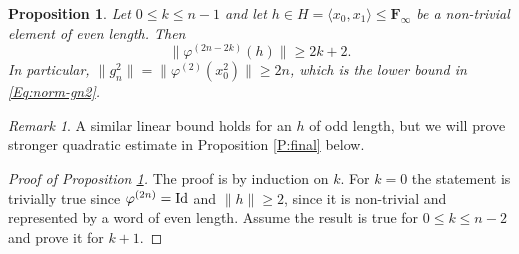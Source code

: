 \documentclass[12pt,reqno,a4paper]{article}
\newtheorem{proposition}[theorem]{Proposition}
\theoremstyle{definition}
\theoremstyle{remark}
\newtheorem{remark}[theorem]{Remark}
\numberwithin{equation}{section}
\numberwithin{figure}{section}
\newcommand{\B}[1]{{\mathbf #1}}
\begin{document}
\begin{proposition}\label{P:fiw-linear}
Let $0\leq k\leq n-1$ and let $h\in H=\langle x_0,x_1\rangle\leq \B F_\infty$ 
be a non-trivial element of even length.
Then
$$
\|\varphi^{(2n-2k)}(h)\|\geq 2k+2.
$$
In particular, $\|g_n^2\|=\|\varphi^{(2)}(x_0^2)\|\geq 2n$, which is the lower bound in \eqref{Eq:norm-gn2}.
\end{proposition}
\begin{remark}
A similar linear bound holds for an $h$ of odd length, but we will
prove stronger quadratic estimate in Proposition \ref{P:final} below.
\end{remark}


\begin{proof}[Proof of Proposition \ref{P:fiw-linear}]
The proof is by induction on $k$. For $k=0$ the statement is
trivially true since $\varphi^{(2n)}={\rm Id}$ and $\|h\|\geq 2$, since
it is non-trivial and represented by a word of even length. Assume 
the result is true for $0\leq k\leq n-2$ and prove it for $k+1$.


\end{proof}
\end{document}
